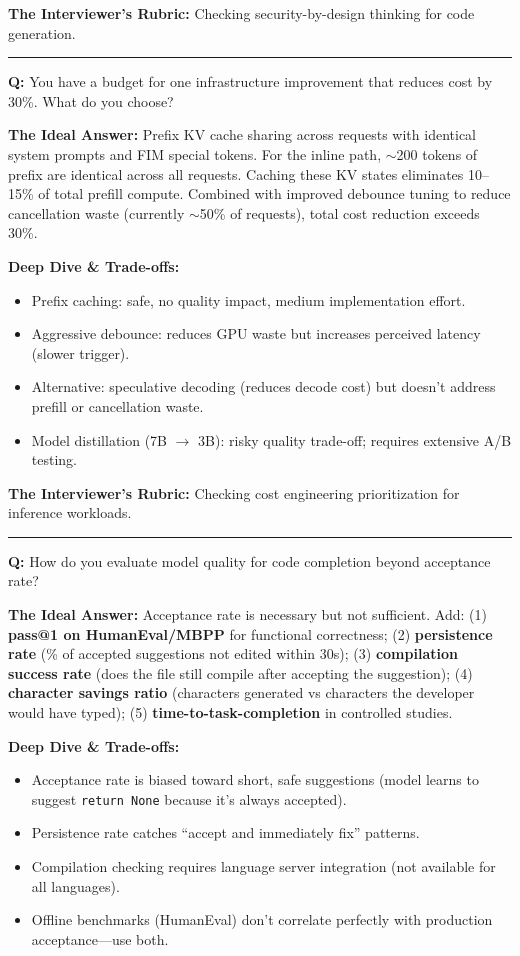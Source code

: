 \textbf{The Interviewer's Rubric:} Checking security-by-design thinking for code generation.

\bigskip\hrule\bigskip

\textbf{Q:} You have a budget for one infrastructure improvement that reduces cost by 30\%. What do you choose?

\textbf{The Ideal Answer:} Prefix KV cache sharing across requests with identical system prompts and FIM special tokens. For the inline path, $\sim$200 tokens of prefix are identical across all requests. Caching these KV states eliminates 10--15\% of total prefill compute. Combined with improved debounce tuning to reduce cancellation waste (currently $\sim$50\% of requests), total cost reduction exceeds 30\%.

\textbf{Deep Dive \& Trade-offs:}
\begin{itemize}
  \item Prefix caching: safe, no quality impact, medium implementation effort.
  \item Aggressive debounce: reduces GPU waste but increases perceived latency (slower trigger).
  \item Alternative: speculative decoding (reduces decode cost) but doesn't address prefill or cancellation waste.
  \item Model distillation (7B $\rightarrow$ 3B): risky quality trade-off; requires extensive A/B testing.
\end{itemize}

\textbf{The Interviewer's Rubric:} Checking cost engineering prioritization for inference workloads.

\bigskip\hrule\bigskip

\textbf{Q:} How do you evaluate model quality for code completion beyond acceptance rate?

\textbf{The Ideal Answer:} Acceptance rate is necessary but not sufficient. Add: (1) \textbf{pass@1 on HumanEval/MBPP} for functional correctness; (2) \textbf{persistence rate} (\% of accepted suggestions not edited within 30s); (3) \textbf{compilation success rate} (does the file still compile after accepting the suggestion); (4) \textbf{character savings ratio} (characters generated vs characters the developer would have typed); (5) \textbf{time-to-task-completion} in controlled studies.

\textbf{Deep Dive \& Trade-offs:}
\begin{itemize}
  \item Acceptance rate is biased toward short, safe suggestions (model learns to suggest \texttt{return None} because it's always accepted).
  \item Persistence rate catches ``accept and immediately fix'' patterns.
  \item Compilation checking requires language server integration (not available for all languages).
  \item Offline benchmarks (HumanEval) don't correlate perfectly with production acceptance---use both.
\end{itemize}

